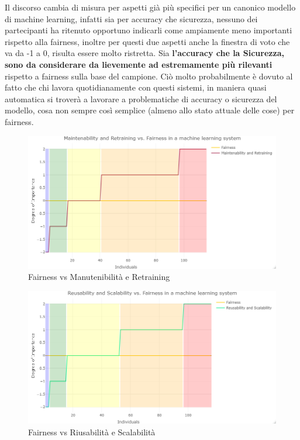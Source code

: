     Il discorso cambia di misura per aspetti già più specifici per un canonico modello di machine learning, infatti sia per accuracy che sicurezza, nessuno dei partecipanti ha ritenuto opportuno indicarli come ampiamente meno importanti rispetto alla fairness, inoltre per questi due aspetti anche la finestra di voto che va da -1 a 0, risulta essere molto ristretta. Sia \textbf{l'accuracy che la Sicurezza, sono da considerare da lievemente ad estremamente più rilevanti} rispetto a fairness sulla base del campione. Ciò molto probabilmente è dovuto al fatto che chi lavora quotidianamente con questi sistemi, in maniera quasi automatica si troverà a lavorare a problematiche di accuracy o sicurezza del modello, cosa non sempre così semplice (almeno allo stato attuale delle cose) per fairness. 
    \begin{figure}[h!]
        \centering
        \includegraphics[width=1\textwidth]{figure/Analisi/RQ3/7.Maintenability and Retraining.png}
        \caption{Fairness vs Manutenibilità e Retraining}
    \end{figure}
    
    \begin{figure}[h!]
        \centering
        \includegraphics[width=1\textwidth]{figure/Analisi/RQ3/8.Reusability and Scalability.png}
        \caption{Fairness vs Riusabilità e Scalabilità}
    \end{figure}
    

